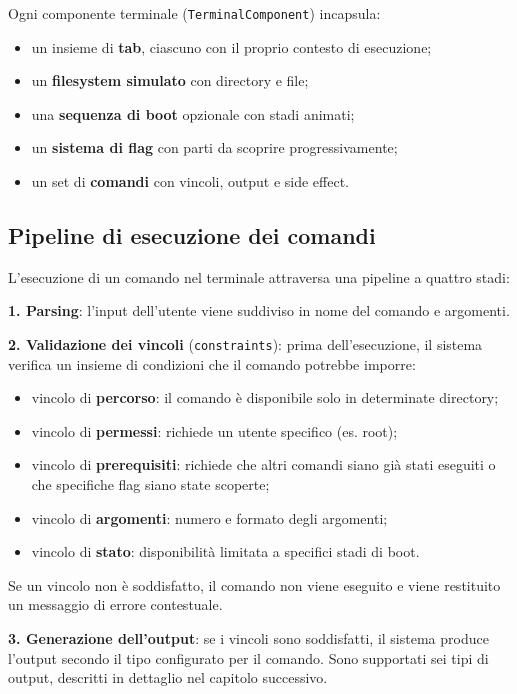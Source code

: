 Ogni componente terminale (\texttt{TerminalComponent}) incapsula:

\begin{itemize}
    \item un insieme di \textbf{tab}, ciascuno con il proprio contesto di esecuzione;
    \item un \textbf{filesystem simulato} con directory e file;
    \item una \textbf{sequenza di boot} opzionale con stadi animati;
    \item un \textbf{sistema di flag} con parti da scoprire progressivamente;
    \item un set di \textbf{comandi} con vincoli, output e side effect.
\end{itemize}

\subsection{Pipeline di esecuzione dei comandi}

L'esecuzione di un comando nel terminale attraversa una pipeline a quattro stadi:

\textbf{1. Parsing}: l'input dell'utente viene suddiviso in nome del comando e argomenti.

\textbf{2. Validazione dei vincoli} (\texttt{constraints}): prima dell'esecuzione, il sistema verifica un insieme di condizioni che il comando potrebbe imporre:
\begin{itemize}
    \item vincolo di \textbf{percorso}: il comando è disponibile solo in determinate directory;
    \item vincolo di \textbf{permessi}: richiede un utente specifico (es. root);
    \item vincolo di \textbf{prerequisiti}: richiede che altri comandi siano già stati eseguiti o che specifiche flag siano state scoperte;
    \item vincolo di \textbf{argomenti}: numero e formato degli argomenti;
    \item vincolo di \textbf{stato}: disponibilità limitata a specifici stadi di boot.
\end{itemize}

Se un vincolo non è soddisfatto, il comando non viene eseguito e viene restituito un messaggio di errore contestuale.

\textbf{3. Generazione dell'output}: se i vincoli sono soddisfatti, il sistema produce l'output secondo il tipo configurato per il comando. Sono supportati sei tipi di output, descritti in dettaglio nel capitolo successivo.

